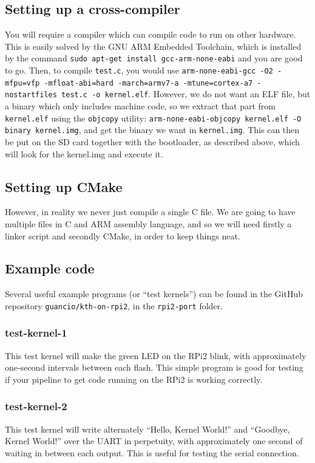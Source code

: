 \documentclass[a4paper,11pt,reqno]{amsart}
\begin{document}
\subsection{Setting up a cross-compiler}
You will require a compiler which can compile code to run on other hardware. This is easily solved by the GNU ARM Embedded Toolchain, which is installed by the command \texttt{sudo apt-get install gcc-arm-none-eabi} and you are good to go. Then, to compile \texttt{test.c}, you would use \texttt{arm-none-eabi-gcc -O2 -mfpu=vfp -mfloat-abi=hard -march=armv7-a -mtune=cortex-a7 -nostartfiles test.c -o kernel.elf}. However, we do not want an ELF file, but a binary which only includes machine code, so we extract that part from \texttt{kernel.elf} using the \texttt{objcopy} utility: \texttt{arm-none-eabi-objcopy kernel.elf -O binary kernel.img}, and get the binary we want in \texttt{kernel.img}. This can then be put on the SD card together with the bootloader, as described above, which will look for the kernel.img and execute it.

\subsection{Setting up CMake}
However, in reality we never just compile a single C file. We are going to have multiple files in C and ARM assembly language, and so we will need firstly a linker script and secondly CMake, in order to keep things neat.

\subsection{Example code}
Several useful example programs (or ``test kernels'') can be found in the GitHub repository \texttt{guancio/kth-on-rpi2}, in the \texttt{rpi2-port} folder.

\subsubsection{test-kernel-1}
This test kernel will make the green LED on the RPi2 blink, with approximately one-second intervals between each flash. This simple program is good for testing if your pipeline to get code running on the RPi2 is working correctly.

\subsubsection{test-kernel-2}
This test kernel will write alternately ``Hello, Kernel World!'' and ``Goodbye, Kernel World!'' over the UART in perpetuity, with approximately one second of waiting in between each output. This is useful for testing the serial connection.
\end{document}
